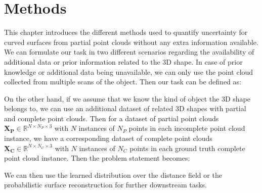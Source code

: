 \chapter{Methods}\label{ch:methods}
This chapter introduces the different methods used to quantify uncertainty for curved surfaces from partial point clouds without any extra information available. We can formulate our task in two different scenarios regarding the availability of additional data or prior information related to the 3D shape. In case of prior knowledge or additional data being unavailable, we can only use the point cloud collected from multiple scans of the object. Then our task can be defined as:
\begin{problemnotitle}\label{SingleCloud}
\end{problemnotitle}

On the other hand, if we assume that we know the kind of object the 3D shape belongs to, we can use an additional dataset of related 3D shapes with partial and complete point clouds. Then for a dataset of partial point clouds $\mathbf{X_P} \in \mathbb{R}^{N \times N_P \times 3}$ with $N$ instances of $N_P$ points in each incomplete point cloud instance, we have a corresponding dataset of complete point clouds $\mathbf{X_C} \in \mathbb{R}^{N \times N_C \times 3}$ with $N$ instances of $N_C$ points in each ground truth complete point cloud instance. Then the problem statement becomes:
\begin{problemnotitle}\label{DataCloud}
\end{problemnotitle}

We can then use the learned distribution over the distance field or the probabilistic surface reconstruction for further downstream tasks.


